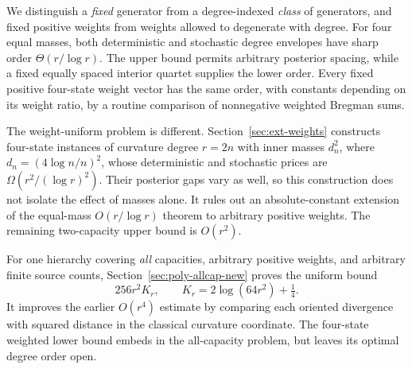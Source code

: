 \documentclass[11pt]{article}
\theoremstyle{definition}\newtheorem{definition}[theorem]{Definition}
\theoremstyle{remark}\newtheorem{remark}[theorem]{Remark}
\begin{document}
We distinguish a \emph{fixed} generator from a degree-indexed \emph{class} of generators, and fixed positive weights from weights allowed to degenerate with degree. For four equal masses, both deterministic and stochastic degree envelopes have sharp order $\Theta(r/\log r)$. The upper bound permits arbitrary posterior spacing, while a fixed equally spaced interior quartet supplies the lower order. Every fixed positive four-state weight vector has the same order, with constants depending on its weight ratio, by a routine comparison of nonnegative weighted Bregman sums.

The weight-uniform problem is different. Section~\ref{sec:ext-weights} constructs four-state instances of curvature degree $r=2n$ with inner masses $d_n^2$, where $d_n=(4\log n/n)^2$, whose deterministic and stochastic prices are $\Omega(r^2/(\log r)^2)$. Their posterior gaps vary as well, so this construction does not isolate the effect of masses alone. It rules out an absolute-constant extension of the equal-mass $O(r/\log r)$ theorem to arbitrary positive weights. The remaining two-capacity upper bound is $O(r^2)$.

For one hierarchy covering \emph{all} capacities, arbitrary positive weights, and arbitrary finite source counts, Section~\ref{sec:poly-allcap-new} proves the uniform bound
\[
256r^2K_r,\qquad K_r=2\log(64r^2)+\tfrac14.
\]
It improves the earlier $O(r^4)$ estimate by comparing each oriented divergence with squared distance in the classical curvature coordinate. The four-state weighted lower bound embeds in the all-capacity problem, but leaves its optimal degree order open.
\end{document}
